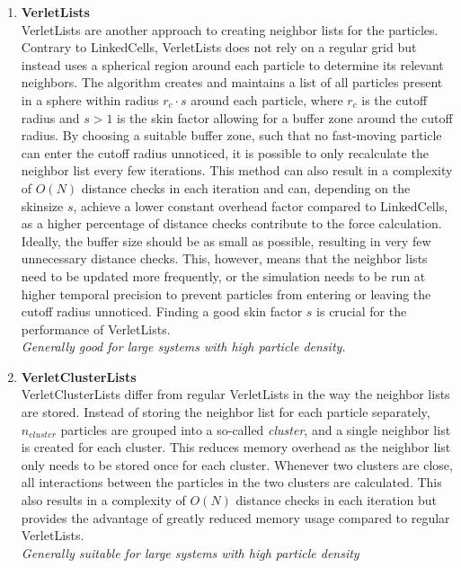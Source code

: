 \begin{enumerate}[label=\textbf{\arabic*.}]
\begin{enumerate}
                  \item \textbf{VerletLists} \\
                        VerletLists are another approach to creating neighbor lists for the particles. Contrary to LinkedCells, VerletLists does not rely on a regular grid but instead uses a spherical region around each particle to determine its relevant neighbors. The algorithm creates and maintains a list of all particles present in a sphere within radius $r_c \cdot s$ around each particle, where $r_c$ is the cutoff radius and $s>1$ is the skin factor allowing for a buffer zone around the cutoff radius.
                        By choosing a suitable buffer zone, such that no fast-moving particle can enter the cutoff radius unnoticed, it is possible to only recalculate the neighbor list every few iterations. This method can also result in a complexity of $O(N)$ distance checks in each iteration and can, depending on the skinsize $s$, achieve a lower constant overhead factor compared to LinkedCells, as a higher percentage of distance checks contribute to the force calculation. Ideally, the buffer size should be as small as possible, resulting in very few unnecessary distance checks. This, however, means that the neighbor lists need to be updated more frequently, or the simulation needs to be run at higher temporal precision to prevent particles from entering or leaving the cutoff radius unnoticed. Finding a good skin factor $s$ is crucial for the performance of VerletLists.\\
                        \textit{Generally good for large systems with high particle density.}

                  \item \textbf{VerletClusterLists} \\
                        VerletClusterLists differ from regular VerletLists in the way the neighbor lists are stored. Instead of storing the neighbor list for each particle separately, $n_{cluster}$ particles are grouped into a so-called \emph{cluster}, and a single neighbor list is created for each cluster. This reduces memory overhead as the neighbor list only needs to be stored once for each cluster. Whenever two clusters are close, all interactions between the particles in the two clusters are calculated. This also results in a complexity of $O(N)$ distance checks in each iteration but provides the advantage of greatly reduced memory usage compared to regular VerletLists.\\
                        \textit{Generally suitable for large systems with high particle density}


\end{enumerate}
\end{enumerate}
